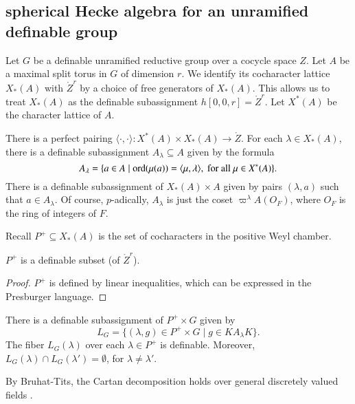 \subsection{spherical Hecke algebra 
for an unramified definable group}

Let $G$ be a definable unramified reductive group over a cocycle space
$Z$.  Let $A$ be a maximal split torus in $G$ of dimension $r$.  We
identify its cocharacter lattice  $X_*(A)$ with $\ring{Z}^r$ by a
choice of free generators of $X_*(A)$.  This allows us to treat
$X_*(A)$ as the definable subassignment $h[0,0,r] = \ring{Z}^r$.  Let
$X^*(A)$ be the character lattice  of $A$.

There is a perfect pairing $\langle\cdot,\cdot\rangle:X^*(A)\times
X_*(A) \to \ring{Z}$.  For each $\lambda\in X_*(A)$, there is a
definable subassignment $A_\lambda \subseteq A$ given by the formula
\begin{equation}\label{eqn:alambda}
A_\lambda = \{ a \in A \mid {\operatorname{ord}}(\mu(a)) 
= \langle{\mu,\lambda}\rangle,\text{ for all } \mu\in X^*(A) \}.
\end{equation}
There is a definable subassignment of $X_*(A)\times A$ given by pairs
$(\lambda,a)$ such that $a\in A_\lambda$.  Of course, $p$-adically,
$A_\lambda$ is just the coset $\varpi^\lambda A(O_F)$, where $O_F$ is
the ring of integers of $F$.

Recall $P^+\subseteq X_*(A)$ is the set of cocharacters in the positive
Weyl chamber.

\begin{lemma} 
  $P^+$ is a definable subset (of $\ring{Z}^r$).
\end{lemma}

\begin{proof} 
  $P^+$ is defined by linear inequalities, which can be expressed in
  the Presburger language.
\end{proof}

\begin{lemma} \label{lemma:cartan}
  There is a definable subassignment of $P^+\times G$ given by 
\[
L_G = \{(\lambda,g)\in P^+\times G \mid g \in K A_\lambda K \}.
\]
The fiber $L_G(\lambda)$ over each $\lambda\in P^+$ is definable.
Moreover, $L_G(\lambda)\cap L_G(\lambda') = \emptyset$, for
$\lambda\ne \lambda'$.
\end{lemma}

By Bruhat-Tits, the Cartan decomposition holds over general discretely valued
fields \cite[4.4.3]{bruhat1972groupes}.

